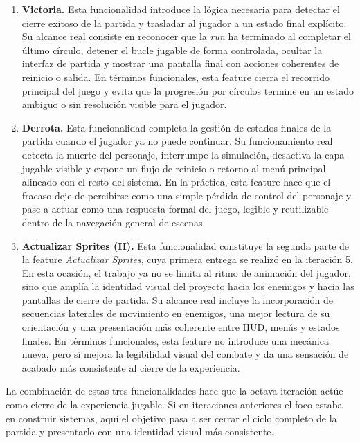 \begin{enumerate}
\item \textbf{Victoria.} Esta funcionalidad introduce la lógica necesaria para detectar el
cierre exitoso de la partida y trasladar al jugador a un estado final explícito. Su alcance
real consiste en reconocer que la \textit{run} ha terminado al completar el último círculo,
detener el bucle jugable de forma controlada, ocultar la interfaz de partida y mostrar una
pantalla final con acciones coherentes de reinicio o salida. En términos funcionales, esta
feature cierra el recorrido principal del juego y evita que la progresión por círculos
termine en un estado ambiguo o sin resolución visible para el jugador.

\item \textbf{Derrota.} Esta funcionalidad completa la gestión de estados finales de la
partida cuando el jugador ya no puede continuar. Su funcionamiento real detecta la muerte del
personaje, interrumpe la simulación, desactiva la capa jugable visible y expone un flujo de
reinicio o retorno al menú principal alineado con el resto del sistema. En la práctica, esta
feature hace que el fracaso deje de percibirse como una simple pérdida de control del
personaje y pase a actuar como una respuesta formal del juego, legible y reutilizable dentro
de la navegación general de escenas.

\item \textbf{Actualizar Sprites (II).} Esta funcionalidad constituye la segunda parte de
la feature \textit{Actualizar Sprites}, cuya primera entrega se realizó en la iteración 5.
En esta ocasión, el trabajo ya no se limita al ritmo de animación del jugador, sino que
amplía la identidad visual del proyecto hacia los enemigos y hacia las pantallas de cierre de
partida. Su alcance real incluye la incorporación de secuencias laterales de movimiento en
enemigos, una mejor lectura de su orientación y una presentación más coherente entre HUD,
menús y estados finales. En términos funcionales, esta feature no introduce una mecánica
nueva, pero sí mejora la legibilidad visual del combate y da una sensación de acabado más
consistente al cierre de la experiencia.
\end{enumerate}

La combinación de estas tres funcionalidades hace que la octava iteración actúe como cierre
de la experiencia jugable. Si en iteraciones anteriores el foco estaba en construir sistemas,
aquí el objetivo pasa a ser cerrar el ciclo completo de la partida y presentarlo con una
identidad visual más consistente.


